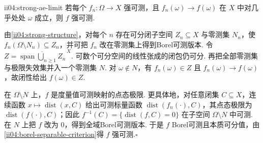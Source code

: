 \begin{FAProposition}[C][强可测性对几乎处处范数极限封闭]{ii04:strong-ae-limit}
若每个 \(\displaystyle f_n:\Omega\to X\) 强可测，且 \(\displaystyle f_n(\omega)\to f(\omega)\) 在 \(\displaystyle X\) 中对几乎处处 \(\displaystyle\omega\) 成立，则 \(\displaystyle f\) 强可测.
\end{FAProposition}

\begin{FAProof}
由\autoref{ii04:strong-structure}，对每个 \(\displaystyle n\) 存在可分闭子空间 \(\displaystyle Z_n\subseteq X\) 与零测集 \(\displaystyle N_n\)，使 \(\displaystyle f_n(\Omega\setminus N_n)\subseteq Z_n\)，并可把 \(\displaystyle f_n\) 改在零测集上得到Borel可测版本. 令
\(\displaystyle Z=\overline{\operatorname{span}\bigcup_{n\geqslant1}Z_n}^{\,X}.\)
可数个可分空间的线性张成的闭包仍可分. 再把全部零测集与极限失效集并入一个零测集 \(\displaystyle N\). 对 \(\displaystyle\omega\notin N\)，有 \(\displaystyle f_n(\omega)\in Z\) 且 \(\displaystyle f_n(\omega)\to f(\omega)\)，故闭性给出 \(\displaystyle f(\omega)\in Z\).

在 \(\displaystyle\Omega\setminus N\) 上，\(\displaystyle f\) 是度量值可测映射的点态极限. 更具体地，对任意闭集 \(\displaystyle C\subseteq X\)，连续函数 \(\displaystyle x\mapsto\operatorname{dist}(x,C)\) 给出可测标量函数 \(\displaystyle\operatorname{dist}(f_n(\cdot),C)\)，其点态极限为 \(\displaystyle\operatorname{dist}(f(\cdot),C)\)；因此 \(\displaystyle f^{-1}(C)=\{\operatorname{dist}(f,C)=0\}\) 在子空间 \(\displaystyle\Omega\setminus N\) 中可测. 在 \(\displaystyle N\) 上把 \(\displaystyle f\) 改为 \(\displaystyle0\)，得到全域Borel可测版本. 于是 \(\displaystyle f\) Borel可测且本质可分值，由\autoref{ii04:borel-separable-criterion}得 \(\displaystyle f\) 强可测.\hfill\(\square\)
\end{FAProof}

